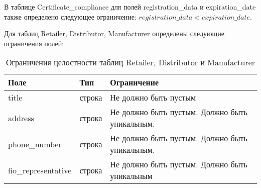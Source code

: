 В таблице Certificate\_compliance для полей registration\_data и expiration\_date также определено следующее ограничение: $ registration\_data < expiration\_date $.


Для таблиц Retailer, Distributor, Manufacturer определены следующие ограничения полей: 

\begin{table}[ht]
	\begin{center}
		\begin{threeparttable}
			\caption{Ограничения целостности таблиц Retailer, Distributor и Manufacturer}
			\label{tbl:entity_rdm}
			\begin{tabular}{|p{4.5cm}|p{2.5cm}|p{8.5cm}|}
				\hline 
				\textbf{Поле} & \textbf{Тип} & \textbf{Ограничение}  \\
				\hline
				title & строка & Не должно быть пустым   \\
				\hline
				address & строка & Не должно быть пустым. Должно быть уникальным.  \\
				\hline
				phone\_number & строка & Не должно быть пустым. Должно быть уникальным. \\
				\hline
				fio\_representative & строка & Не должно быть пустым. Должно быть уникальным \\
				\hline
			\end{tabular}
		\end{threeparttable}			
	\end{center}
\end{table}

